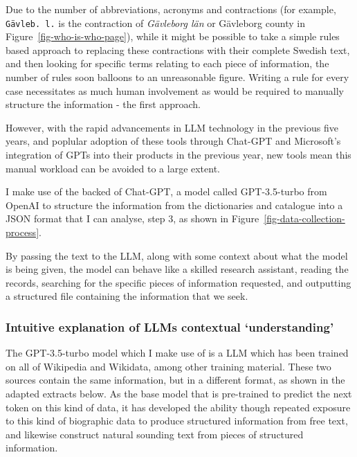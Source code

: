 \documentclass[
]{article}
\begin{document}
Due to the number of abbreviations, acronyms and contractions (for
example, \texttt{Gävleb.\ l.} is the contraction of \emph{Gävleborg län}
or Gävleborg county in Figure~\ref{fig-who-is-who-page}), while it might
be possible to take a simple rules based approach to replacing these
contractions with their complete Swedish text, and then looking for
specific terms relating to each piece of information, the number of
rules soon balloons to an unreasonable figure. Writing a rule for every
case necessitates as much human involvement as would be required to
manually structure the information - the first approach.

However, with the rapid advancements in LLM technology in the previous
five years, and poplular adoption of these tools through Chat-GPT and
Microsoft's integration of GPTs into their products in the previous
year, new tools mean this manual workload can be avoided to a large
extent.

I make use of the backed of Chat-GPT, a model called GPT-3.5-turbo from
OpenAI to structure the information from the dictionaries and catalogue
into a JSON format that I can analyse, step 3, as shown in
Figure~\ref{fig-data-collection-process}.

By passing the text to the LLM, along with some context about what the
model is being given, the model can behave like a skilled research
assistant, reading the records, searching for the specific pieces of
information requested, and outputting a structured file containing the
information that we seek.

\hypertarget{intuitive-explanation-of-llms-contextual-understanding}{%
\subsubsection{Intuitive explanation of LLMs contextual
`understanding'}\label{intuitive-explanation-of-llms-contextual-understanding}}

The GPT-3.5-turbo model which I make use of is a LLM which has been
trained on all of Wikipedia and Wikidata, among other training material.
These two sources contain the same information, but in a different
format, as shown in the adapted extracts below. As the base model that
is pre-trained to predict the next token on this kind of data, it has
developed the ability though repeated exposure to this kind of
biographic data to produce structured information from free text, and
likewise construct natural sounding text from pieces of structured
information.
\end{document}
